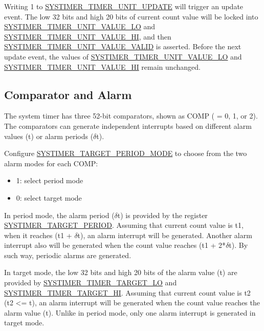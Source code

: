 \documentclass[main\_\_EN.tex]{subfiles}
\begin{document}
Writing 1 to \hyperref[fielddesc:SYSTIMERTIMERUNIT0UPDATE]{SYSTIMER\_TIMER\_UNIT\_UPDATE} will trigger an update event. The low 32 bits and high 20 bits of current count value will be locked into \hyperref[fielddesc:SYSTIMERTIMERUNIT0VALUELO]{SYSTIMER\_TIMER\_UNIT\_VALUE\_LO} and \hyperref[fielddesc:SYSTIMERTIMERUNIT0VALUEHI]{SYSTIMER\_TIMER\_UNIT\_VALUE\_HI}, and then \hyperref[fielddesc:SYSTIMERTIMERUNIT0VALUEVALID]{SYSTIMER\_TIMER\_UNIT\_VALUE\_VALID} is asserted. Before the next update event, the values of \hyperref[fielddesc:SYSTIMERTIMERUNIT0VALUELO]{SYSTIMER\_TIMER\_UNIT\_VALUE\_LO} and \hyperref[fielddesc:SYSTIMERTIMERUNIT0VALUEHI]{SYSTIMER\_TIMER\_UNIT\_VALUE\_HI} remain unchanged.


\subsection{Comparator and Alarm}
The system timer has three 52-bit comparators, shown as COMP ( = 0, 1, or 2). The comparators can generate independent interrupts based on different alarm values (t) or alarm periods ($\delta$t).

Configure \hyperref[fielddesc:SYSTIMERTARGET0PERIODMODE]{SYSTIMER\_TARGET\_PERIOD\_MODE} to choose from the two alarm modes for each COMP:
\begin{itemize}
    \item 1: select period mode
    \item 0: select target mode
\end{itemize}

In period mode, the alarm period ($\delta$t) is provided by the register \hyperref[fielddesc:SYSTIMERTARGET2PERIOD]{SYSTIMER\_TARGET\_PERIOD}. Assuming that current count value is t1, when it reaches (t1 + $\delta$t), an alarm interrupt will be generated. Another alarm interrupt also will be generated when the count value reaches (t1 + 2*$\delta$t). By such way, periodic alarms are generated.

In target mode, the low 32 bits and high 20 bits of the alarm value (t) are provided by \hyperref[fielddesc:SYSTIMERTIMERTARGET0LO]{SYSTIMER\_TIMER\_TARGET\_LO} and \hyperref[fielddesc:SYSTIMERTIMERTARGET0HI]{SYSTIMER\_TIMER\_TARGET\_HI}. Assuming that current count value is t2 (t2 <= t), an alarm interrupt will be generated when the count value reaches the alarm value (t). Unlike in period mode, only one alarm interrupt is generated in target mode.
\end{document}
